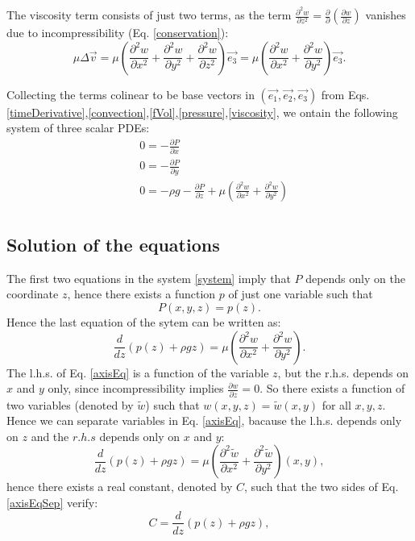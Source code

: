 \documentclass[DIV=12]{article}
\newcommand{\eBase}{(\vec{e_1}, \vec{e_2},\vec{e_3})}
\begin{document}
The viscosity term consists of just two terms, as the term $\frac{\partial^2 w}{\partial z^2} = \frac{\partial }{\partial }\left( \frac{\partial w}{\partial z } \right)$
 vanishes due to incompressibility (Eq. \ref{conservation}):
\begin{equation}
\boxed{
\mu \Delta \vec{v} = \mu\left(\frac{\partial^2 w}{\partial x^2} + \frac{\partial^2 w}{\partial y^2} + \frac{\partial^2 w}{\partial z^2}   \right) \vec{e_3} = \mu\left(\frac{\partial^2 w}{\partial x^2} + \frac{\partial^2 w}{\partial y^2}   \right) \vec{e_3}.}
 \label{viscosity}
\end{equation}

Collecting the terms colinear to be base vectors in $\eBase$ from Eqs. \ref{timeDerivative},\ref{convection},\ref{fVol},\ref{pressure},\ref{viscosity}, we
 ontain the following system of three scalar PDEs:
\begin{equation}
  \begin{array}{ll} &0 = -\frac{\partial P}{ \partial x} \\
   &0 = -\frac{\partial P}{ \partial y}\\
   &0 =  -\rho g - \frac{\partial P}{ \partial z} +\mu\left(\frac{\partial^2 w}{\partial x^2} + \frac{\partial^2 w}{\partial y^2}   \right)\\
   \end{array}
\label{system}
\end{equation}

\subsection{Solution of the equations}
The first two equations in the system \ref{system} imply that $P$ depends only on the coordinate $z$, hence there exists a function
 $p$ of just one variable such that 
\begin{equation}
 P(x,y,z) = p(z).
\end{equation}
Hence the last equation of the sytem can be written as:
\begin{equation}
\frac{d}{dz}( p( z ) + \rho g z ) = \mu \left(\frac{\partial^2 w}{\partial x^2} + \frac{\partial^2 w}{\partial y^2}   \right).
\label{axisEq}
\end{equation}
 The l.h.s. of Eq. \ref{axisEq} is a function of the variable $z$, but the r.h.s. depends on $x$ and $y$ only,
 since incompressibility implies $\frac{\partial w}{\partial z} = 0$. So there exists a function of two variables (denoted by $\tilde{w}$) such 
 that $w(x,y,z) = {\tilde{w}}(x,y)$ for all $x,y,z$.\\ 
Hence we can separate variables in Eq. \ref{axisEq}, bacause the l.h.s. depends only on $z$ and the $r.h.s$ depends only 
 on $x$ and $y$:
\begin{equation}
\frac{d}{dz}( p( z ) + \rho g z ) = \mu \left(\frac{\partial^2 {\tilde{w}}}{\partial x^2} + \frac{\partial^2 {\tilde{w}}}{\partial y^2}   \right)(x,y),
\label{axisEqSep}
\end{equation}
hence there exists a real constant, denoted by $C$, such that
  the two sides of Eq. \ref{axisEqSep} verify:
\begin{equation}
 C = \frac{d}{dz}( p( z ) + \rho g z ),
\label{CDef}
\end{equation}
\end{document}
